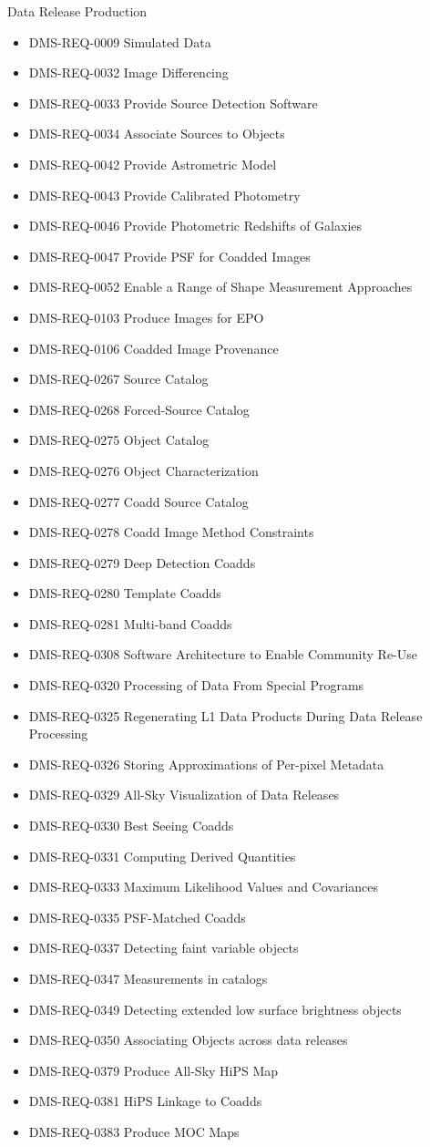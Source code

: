 Data Release Production \begin{itemize}
\item DMS-REQ-0009 Simulated Data
\item DMS-REQ-0032 Image Differencing
\item DMS-REQ-0033 Provide Source Detection Software
\item DMS-REQ-0034 Associate Sources to Objects
\item DMS-REQ-0042 Provide Astrometric Model
\item DMS-REQ-0043 Provide Calibrated Photometry
\item DMS-REQ-0046 Provide Photometric Redshifts of Galaxies
\item DMS-REQ-0047 Provide PSF for Coadded Images
\item DMS-REQ-0052 Enable a Range of Shape Measurement Approaches
\item DMS-REQ-0103 Produce Images for EPO
\item DMS-REQ-0106 Coadded Image Provenance
\item DMS-REQ-0267 Source Catalog
\item DMS-REQ-0268 Forced-Source Catalog
\item DMS-REQ-0275 Object Catalog
\item DMS-REQ-0276 Object Characterization
\item DMS-REQ-0277 Coadd Source Catalog
\item DMS-REQ-0278 Coadd Image Method Constraints
\item DMS-REQ-0279 Deep Detection Coadds
\item DMS-REQ-0280 Template Coadds
\item DMS-REQ-0281 Multi-band Coadds
\item DMS-REQ-0308 Software Architecture to Enable Community Re-Use
\item DMS-REQ-0320 Processing of Data From Special Programs
\item DMS-REQ-0325 Regenerating L1 Data Products During Data Release Processing
\item DMS-REQ-0326 Storing Approximations of Per-pixel Metadata
\item DMS-REQ-0329 All-Sky Visualization of Data Releases
\item DMS-REQ-0330 Best Seeing Coadds
\item DMS-REQ-0331 Computing Derived Quantities
\item DMS-REQ-0333 Maximum Likelihood Values and Covariances
\item DMS-REQ-0335 PSF-Matched Coadds
\item DMS-REQ-0337 Detecting faint variable objects
\item DMS-REQ-0347 Measurements in catalogs
\item DMS-REQ-0349 Detecting extended  low surface brightness objects
\item DMS-REQ-0350 Associating Objects across data releases
\item DMS-REQ-0379 Produce All-Sky HiPS Map
\item DMS-REQ-0381 HiPS Linkage to Coadds
\item DMS-REQ-0383 Produce MOC Maps
\end{itemize}
